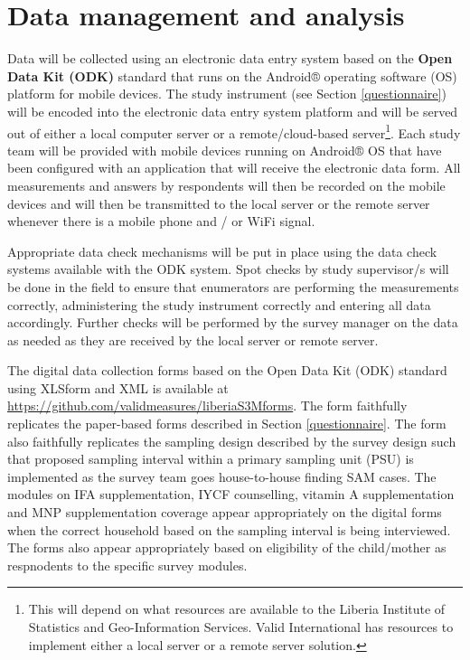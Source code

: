 \documentclass[12pt,a4paper]{book}
\let\rmarkdownfootnote\footnote%
\def\footnote{\protect\rmarkdownfootnote}
\theoremstyle{definition}
\theoremstyle{definition}
\theoremstyle{definition}
\theoremstyle{remark}
\begin{document}
\hypertarget{data}{%
\chapter{Data management and analysis}\label{data}}

Data will be collected using an electronic data entry system based on
the \textbf{Open Data Kit (ODK)} standard that runs on the Android®
operating software (OS) platform for mobile devices. The study
instrument (see Section \ref{questionnaire}) will be encoded into the
electronic data entry system platform and will be served out of either a
local computer server or a remote/cloud-based server\footnote{This will
  depend on what resources are available to the Liberia Institute of
  Statistics and Geo-Information Services. Valid International has
  resources to implement either a local server or a remote server
  solution.}. Each study team will be provided with mobile devices
running on Android® OS that have been configured with an application
that will receive the electronic data form. All measurements and answers
by respondents will then be recorded on the mobile devices and will then
be transmitted to the local server or the remote server whenever there
is a mobile phone and / or WiFi signal.

Appropriate data check mechanisms will be put in place using the data
check systems available with the ODK system. Spot checks by study
supervisor/s will be done in the field to ensure that enumerators are
performing the measurements correctly, administering the study
instrument correctly and entering all data accordingly. Further checks
will be performed by the survey manager on the data as needed as they
are received by the local server or remote server.

The digital data collection forms based on the Open Data Kit (ODK)
standard using XLSform and XML is available at
\url{https://github.com/validmeasures/liberiaS3Mforms}. The form
faithfully replicates the paper-based forms described in Section
\ref{questionnaire}. The form also faithfully replicates the sampling
design described by the survey design such that proposed sampling
interval within a primary sampling unit (PSU) is implemented as the
survey team goes house-to-house finding SAM cases. The modules on IFA
supplementation, IYCF counselling, vitamin A supplementation and MNP
supplementation coverage appear appropriately on the digital forms when
the correct household based on the sampling interval is being
interviewed. The forms also appear appropriately based on eligibility of
the child/mother as respnodents to the specific survey modules.
\end{document}
